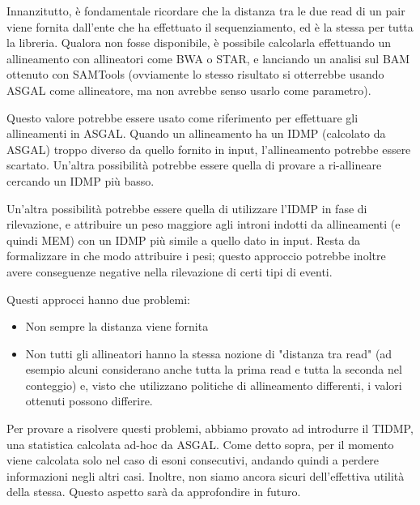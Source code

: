 Innanzitutto, è fondamentale ricordare che la distanza tra le due read di un pair viene fornita dall'ente che ha effettuato il sequenziamento, ed è la stessa per tutta la libreria. Qualora non fosse disponibile, è possibile calcolarla effettuando un allineamento con allineatori come BWA o STAR, e lanciando un analisi sul BAM ottenuto con SAMTools (ovviamente lo stesso risultato si otterrebbe usando ASGAL come allineatore, ma non avrebbe senso usarlo come parametro).

Questo valore potrebbe essere usato come riferimento per effettuare gli allineamenti in ASGAL. Quando un allineamento ha un IDMP (calcolato da ASGAL) troppo diverso da quello fornito in input, l'allineamento potrebbe essere scartato. Un'altra possibilità potrebbe essere quella di provare a ri-allineare cercando un IDMP più basso. 

Un'altra possibilità potrebbe essere quella di utilizzare l'IDMP in fase di rilevazione, e attribuire un peso maggiore agli introni indotti da allineamenti (e quindi MEM) con un IDMP più simile a quello dato in input. Resta da formalizzare in che modo attribuire i pesi; questo approccio potrebbe inoltre avere conseguenze negative nella rilevazione di certi tipi di eventi.

Questi approcci hanno due problemi:
\begin{itemize}
	\item Non sempre la distanza viene fornita
	\item Non tutti gli allineatori hanno la stessa nozione di "distanza tra read" (ad esempio alcuni considerano anche tutta la prima read e tutta la seconda nel conteggio) e, visto che utilizzano politiche di allineamento differenti, i valori ottenuti possono differire.
\end{itemize}

Per provare a risolvere questi problemi, abbiamo provato ad introdurre il TIDMP, una statistica calcolata ad-hoc da ASGAL. Come detto sopra, per il momento viene calcolata solo nel caso di esoni consecutivi, andando quindi a perdere informazioni negli altri casi. Inoltre, non siamo ancora sicuri dell'effettiva utilità della stessa. Questo aspetto sarà da approfondire in futuro.

\newpage